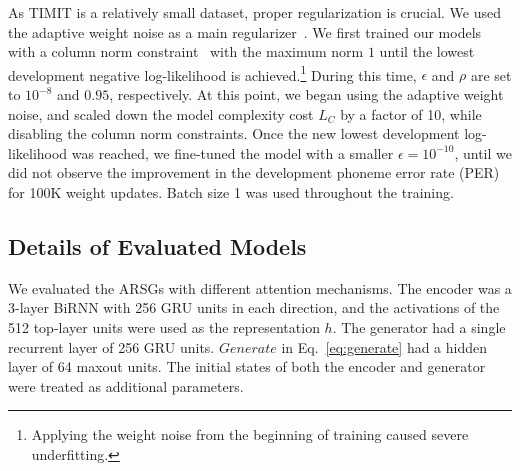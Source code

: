 \documentclass{article} %
\begin{document}
As TIMIT is a relatively small dataset, proper regularization is crucial. We used
the adaptive weight noise as a main regularizer~\cite{graves_2011}.  We first
trained our models with a column norm constraint~\cite{hinton_2012} with the
maximum norm $1$
until the lowest development negative log-likelihood is achieved.\footnote{
    Applying the weight noise from the beginning of training caused severe
    underfitting.
}
During this time, $\epsilon$ and $\rho$ are set to $10^{-8}$ and $0.95$,
respectively.  At this point, we began using the adaptive weight noise, and
scaled down the model complexity cost $L_C$ by a factor of 10, while disabling
the column norm constraints. Once
the new lowest development log-likelihood was reached, we fine-tuned the model
with a smaller $\epsilon=10^{-10}$, until we did
not observe the improvement in the development phoneme error rate (PER) for 100K
weight updates. Batch size 1 was used throughout the
training.




\subsection{Details of Evaluated Models}
\label{sec:evaluate}

We evaluated the ARSGs with different attention mechanisms.  The encoder was a
3-layer BiRNN with 256 GRU units in each direction, and the activations of the
512 top-layer units were used as the representation $h$.  The generator had a
single recurrent layer of 256 GRU units. 
$Generate$ in Eq.~\eqref{eq:generate} had a hidden layer of 64 maxout units.
The initial states of both the encoder and generator were treated as additional
parameters.
\end{document}
